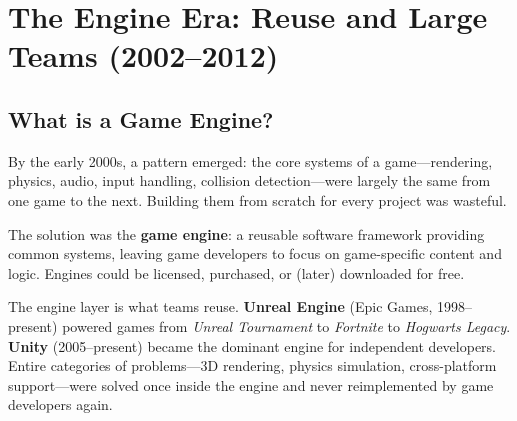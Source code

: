 \documentclass[11pt,letterpaper]{article}
\newcommand{\keyterm}[1]{\textbf{\textcolor{cssecondary}{#1}}}
\begin{document}
\section{The Engine Era: Reuse and Large Teams (2002--2012)}

\subsection{What is a Game Engine?}

By the early 2000s, a pattern emerged: the core systems of a game---rendering, physics, audio, input handling, collision detection---were largely the same from one game to the next. Building them from scratch for every project was wasteful.

The solution was the \keyterm{game engine}: a reusable software framework providing common systems, leaving game developers to focus on game-specific content and logic. Engines could be licensed, purchased, or (later) downloaded for free.

\begin{center}
\end{center}

The engine layer is what teams reuse. \textbf{Unreal Engine} (Epic Games, 1998--present) powered games from \textit{Unreal Tournament} to \textit{Fortnite} to \textit{Hogwarts Legacy}. \textbf{Unity} (2005--present) became the dominant engine for independent developers. Entire categories of problems---3D rendering, physics simulation, cross-platform support---were solved once inside the engine and never reimplemented by game developers again.
\end{document}
